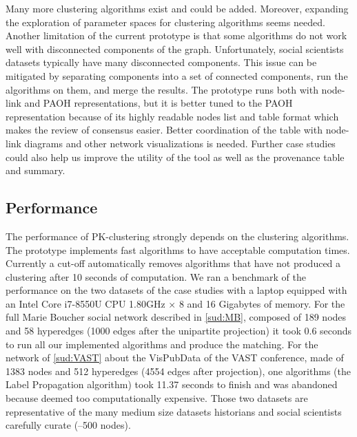 Many more clustering algorithms exist and could be added.
Moreover, expanding the exploration of parameter spaces for clustering algorithms seems needed.  Another limitation of the current prototype is that some algorithms do not work well with disconnected components of the graph. Unfortunately, social scientists datasets typically have many disconnected components. This issue can be mitigated by separating components into a set of connected components, run the algorithms on them, and merge the results.
The prototype runs both with node-link and PAOH representations, but it is better tuned to the PAOH representation because of its highly readable nodes list and table format which makes the review of consensus easier. Better coordination of the table with node-link diagrams and other network visualizations is needed.
Further case studies could also help us improve the utility of the tool as well as the provenance table and summary.

\subsection{Performance}
\label{sub:performances}

The performance of PK-clustering strongly depends on the clustering algorithms. The prototype implements fast algorithms to have acceptable computation times.  Currently a cut-off automatically removes algorithms that have not produced a clustering after 10 seconds of computation.
We ran a benchmark of the performance on the two datasets of the case studies with a laptop equipped with an Intel Core i7-8550U CPU 1.80GHz × 8 and 16 Gigabytes of memory.
For the full Marie Boucher social network described in \autoref{sud:MB}, composed of 189 nodes and 58 hyperedges (1000 edges after the unipartite projection) it took 0.6 seconds to run all our implemented algorithms and produce the matching.
For the network of \autoref{sud:VAST} about the VisPubData of the VAST conference, made of 1383 nodes and 512 hyperedges (4554 edges after projection), one algorithms (the Label Propagation algorithm) took 11.37 seconds to finish and was abandoned because deemed too computationally expensive.
Those two datasets are representative of the many medium size datasets historians and social scientists carefully curate (--500 nodes).

